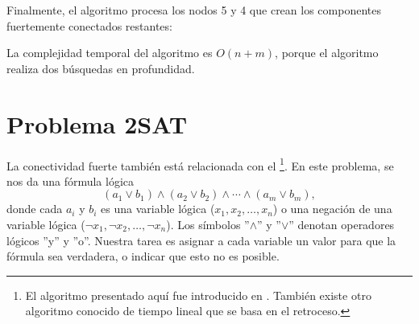 \begin{samepage}
Finalmente, el algoritmo procesa los nodos 5 y 4
que crean los componentes fuertemente conectados restantes:

\begin{center}
\end{center}
\end{samepage}

La complejidad temporal del algoritmo es $O(n+m)$,
porque el algoritmo
realiza dos búsquedas en profundidad.

\section{Problema 2SAT}


La conectividad fuerte también está relacionada con el
\footnote{El algoritmo presentado aquí fue
introducido en \cite{asp79}.
También existe otro algoritmo conocido de tiempo lineal \cite{eve75}
que se basa en el retroceso.}.
En este problema, se nos da una fórmula lógica
\[
(a_1 \lor b_1) \land (a_2 \lor b_2) \land \cdots \land (a_m \lor b_m),
\]
donde cada $a_i$ y $b_i$ es una variable lógica
($x_1,x_2,\ldots,x_n$)
o una negación de una variable lógica
($\lnot x_1, \lnot x_2, \ldots, \lnot x_n$).
Los símbolos ''$\land$'' y ''$\lor$'' denotan
operadores lógicos ''y'' y ''o''.
Nuestra tarea es asignar a cada variable un valor
para que la fórmula sea verdadera, o indicar
que esto no es posible.

